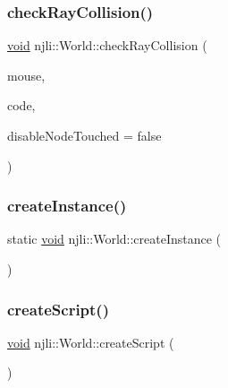 \mbox{\label{classnjli_1_1_world_ae023b659a2be3ea9dd38ff1fdef93bd6}} 
\subsubsection{\texorpdfstring{check\+Ray\+Collision()}{checkRayCollision()}\hspace{0.1cm}{\footnotesize\ttfamily [3/3]}}
{\footnotesize\ttfamily \mbox{\hyperlink{_thread_8h_af1e856da2e658414cb2456cb6f7ebc66}{void}} njli\+::\+World\+::check\+Ray\+Collision (\begin{DoxyParamCaption}\item[{const \mbox{\hyperlink{classnjli_1_1_device_mouse}{Device\+Mouse}} \&}]{mouse,  }\item[{const char $\ast$}]{code,  }\item[{bool}]{disable\+Node\+Touched = {\ttfamily false} }\end{DoxyParamCaption})\hspace{0.3cm}{\ttfamily [protected]}}

\mbox{\label{classnjli_1_1_world_a7e31e4dff9169bd82c24e69ff29b53b6}} 
\subsubsection{\texorpdfstring{create\+Instance()}{createInstance()}}
{\footnotesize\ttfamily static \mbox{\hyperlink{_thread_8h_af1e856da2e658414cb2456cb6f7ebc66}{void}} njli\+::\+World\+::create\+Instance (\begin{DoxyParamCaption}{ }\end{DoxyParamCaption})\hspace{0.3cm}{\ttfamily [static]}}

\mbox{\label{classnjli_1_1_world_a32797f128d963f99839c12faf4b4dc12}} 
\subsubsection{\texorpdfstring{create\+Script()}{createScript()}}
{\footnotesize\ttfamily \mbox{\hyperlink{_thread_8h_af1e856da2e658414cb2456cb6f7ebc66}{void}} njli\+::\+World\+::create\+Script (\begin{DoxyParamCaption}{ }\end{DoxyParamCaption})}

